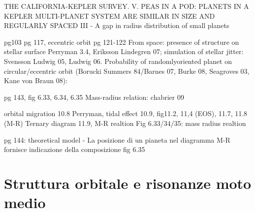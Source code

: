 \begin{workout}
THE CALIFORNIA-KEPLER SURVEY. V. PEAS IN A POD: PLANETS IN A KEPLER MULTI-PLANET SYSTEM ARE SIMILAR IN SIZE AND REGULARLY SPACED
						 III - A gap in radius distribution of small planets
\end{workout}

\begin{workout}
pg103
pg 117, eccentric orbit pg 121-122
From space: presence of structure on stellar surface Perryman 3.4, Eriksson Lindegren 07; simulation of stellar jitter: Svensson Ludwig 05, Ludwig 06.
Probability of randomlyoriented planet on circular/eccentric orbit (Borucki Summers 84/Barnes 07, Burke 08,  Seagroves 03, Kane von Braun 08):
\end{workout}

\begin{workout}
pg 143, fig 6.33, 6.34, 6.35
Mass-radius relation: chabrier 09
\end{workout}



\begin{workout}[M-R diagram]
orbital migration 10.8 Perryman, tidal effect 10.9, 
fig11.2, 11,4 (EOS), 11.7, 11.8 (M-R)
Ternary diagram 11.9, M-R realtion
Fig 6.33/34/35: mass radius realtion

pg 144: theoretical model - La posizione di un pianeta nel diagramma M-R fornisce indicazione della composizione
fig 6.35
\end{workout}

\section{Struttura orbitale e risonanze moto medio}


